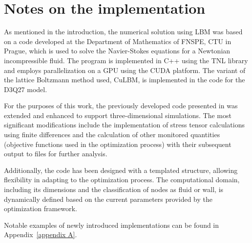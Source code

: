 \section{Notes on the implementation}\label{notes on the LBM implementation}
As mentioned in the introduction, the numerical solution using LBM was based on a code developed at the Department of Mathematics of FNSPE, CTU in Prague, which is used to solve the Navier-Stokes equations for a Newtonian incompressible fluid. The program is implemented in C++ using the TNL library \cite{Oberhuber2021, Klinkovsky2022} and employs parallelization on a GPU using the CUDA platform. The variant of the lattice Boltzmann method used, CuLBM, is implemented in the code for the D3Q27 model.

For the purposes of this work, the previously developed code presented in \cite{buresVU} was extended and enhanced to support three-dimensional simulations. The most significant modifications include the implementation of stress tensor calculations using finite differences and the calculation of other monitored quantities (objective functions used in the optimization process) with their subsequent output to files for further analysis.

Additionally, the code has been designed with a templated structure, allowing flexibility in adapting to the optimization process. The computational domain, including its dimensions and the classification of nodes as fluid or wall, is dynamically defined based on the current parameters provided by the optimization framework.

Notable examples of newly introduced implementations can be found in Appendix~\ref{appendix A}.